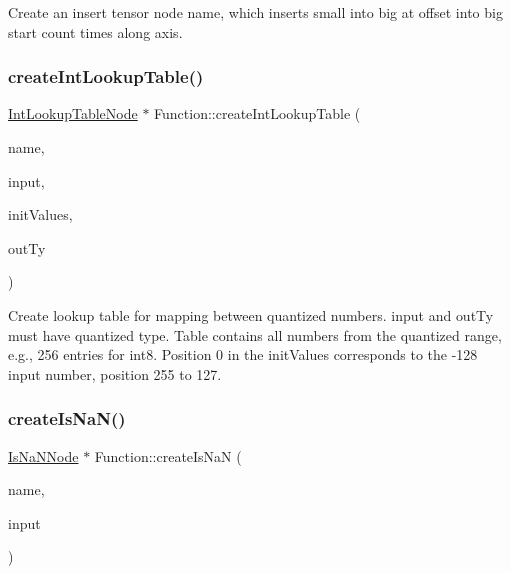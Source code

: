 Create an insert tensor node {\ttfamily name}, which inserts {\ttfamily small} into {\ttfamily big} at offset into big {\ttfamily start} {\ttfamily count} times along {\ttfamily axis}. \mbox{\label{classglow_1_1_function_ab6fb9971cd6af5a091098680ae2a26e0}} 
\subsubsection{\texorpdfstring{create\+Int\+Lookup\+Table()}{createIntLookupTable()}}
{\footnotesize\ttfamily \hyperlink{classglow_1_1_int_lookup_table_node}{Int\+Lookup\+Table\+Node} $\ast$ Function\+::create\+Int\+Lookup\+Table (\begin{DoxyParamCaption}\item[{llvm\+::\+String\+Ref}]{name,  }\item[{\hyperlink{structglow_1_1_node_value}{Node\+Value}}]{input,  }\item[{llvm\+::\+Array\+Ref$<$ int8\+\_\+t $>$}]{init\+Values,  }\item[{\hyperlink{structglow_1_1_type}{Type\+Ref}}]{out\+Ty }\end{DoxyParamCaption})}

Create lookup table for mapping between quantized numbers. {\ttfamily input} and {\ttfamily out\+Ty} must have quantized type. Table contains all numbers from the quantized range, e.\+g., 256 entries for int8. Position 0 in the {\ttfamily init\+Values} corresponds to the -\/128 input number, position 255 to 127. \mbox{\label{classglow_1_1_function_a441d3bf4a13e444a8ddaa5e129e3acee}} 
\subsubsection{\texorpdfstring{create\+Is\+Na\+N()}{createIsNaN()}}
{\footnotesize\ttfamily \hyperlink{classglow_1_1_is_na_n_node}{Is\+Na\+N\+Node} $\ast$ Function\+::create\+Is\+NaN (\begin{DoxyParamCaption}\item[{llvm\+::\+String\+Ref}]{name,  }\item[{\hyperlink{structglow_1_1_node_value}{Node\+Value}}]{input }\end{DoxyParamCaption})}


